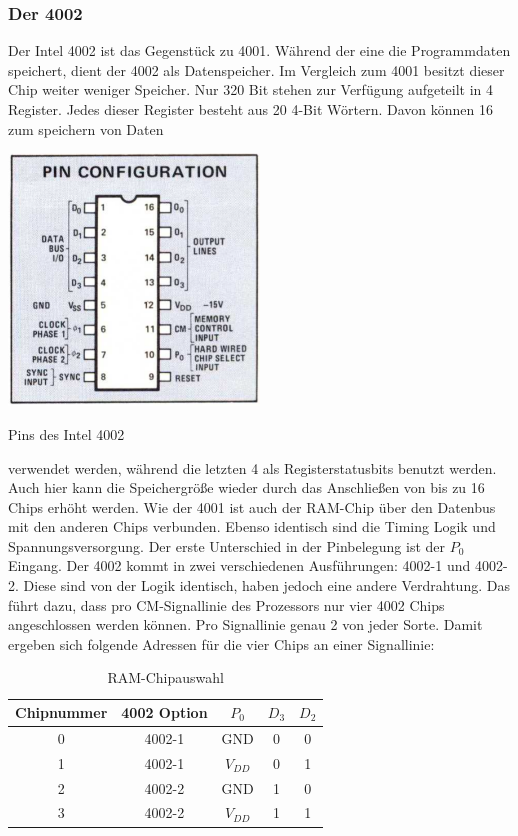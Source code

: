 \subsubsection{Der 4002}
Der Intel 4002 ist das Gegenstück zu 4001. Während der eine die Programmdaten speichert, dient der 4002 als Datenspeicher. Im Vergleich zum 4001 besitzt dieser Chip weiter weniger Speicher. Nur 320 Bit stehen zur Verfügung aufgeteilt in 4 Register. Jedes dieser Register besteht aus 20 4-Bit Wörtern. Davon können 16 zum speichern von Daten
\vspace{-23pt}
 \begin{floatingfigure}[r]{.5\textwidth}
 	\vspace{-10pt}
 	\includegraphics[width=0.5\textwidth]{figures/pins_4002.png}
 	\caption{Pins des Intel 4002}
 	\label{fig:pins_4002}
 \end{floatingfigure}
verwendet werden, während die letzten 4 als Registerstatusbits benutzt werden. Auch hier kann die Speichergröße wieder durch das Anschließen von bis zu 16 Chips erhöht werden. Wie der 4001 ist auch der RAM-Chip über den Datenbus mit den anderen Chips verbunden. Ebenso identisch sind die Timing Logik und Spannungsversorgung. Der erste Unterschied in der Pinbelegung ist der $P_0$ Eingang. Der 4002 kommt in zwei verschiedenen Ausführungen: 4002-1 und 4002-2. Diese sind von der Logik identisch, haben jedoch eine andere Verdrahtung. Das führt dazu, dass pro CM-Signallinie des Prozessors nur vier 4002 Chips angeschlossen werden können. Pro Signallinie genau 2 von jeder Sorte.
Damit ergeben sich folgende Adressen für die vier Chips an einer Signallinie:
\begin{table}[H]
	\centering
	\begin{tabular}{c | c | c | c  c}
		Chipnummer & 4002 Option & $P_0$ & $D_3$ & $D_2$ \\
		\hline
		0 	& 4002-1 & GND & 0 & 0 \\
		1	& 4002-1 & $V_{DD}$ & 0 & 1 \\
		2	& 4002-2 & GND & 1 & 0 \\
		3	& 4002-2 & $V_{DD}$ & 1 & 1	
	\end{tabular}
	\caption{RAM-Chipauswahl}
	\label{ramauswahl}
\end{table}

